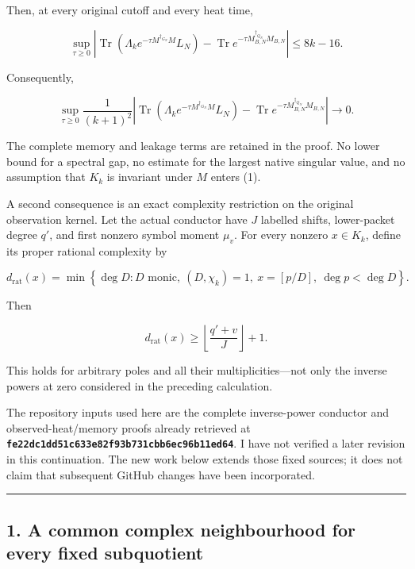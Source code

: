 \documentclass[11pt]{article}
\begin{document}
Then, at every original cutoff and every heat time,

\[
\boxed{
\sup_{\tau\ge0}
\left|
\operatorname{Tr}\!\left(\Lambda_k e^{-\tau M^{\dagger_{G_N}}M}L_N\right)
-\operatorname{Tr}e^{-\tau M_{B,N}^{\dagger_{Q_N}}M_{B,N}}
\right|
\le 8k-16.
}
\tag{1}
\]

Consequently,

\[
\boxed{
\sup_{\tau\ge0}
\frac1{(k+1)^2}
\left|
\operatorname{Tr}\!\left(\Lambda_k e^{-\tau M^{\dagger_{G_N}}M}L_N\right)
-\operatorname{Tr}e^{-\tau M_{B,N}^{\dagger_{Q_N}}M_{B,N}}
\right|
\longrightarrow0.
}
\tag{2}
\]

The complete memory and leakage terms are retained in the proof. No lower bound for a spectral gap, no estimate for the largest native singular value, and no assumption that \(K_k\) is invariant under \(M\) enters (1).

A second consequence is an exact complexity restriction on the original observation kernel. Let the actual conductor have \(J\) labelled shifts, lower-packet degree \(q'\), and first nonzero symbol moment \(\mu_v\). For every nonzero \(x\in K_k\), define its proper rational complexity by

\[
d_{\mathrm{rat}}(x)
=
\min\left\{
\deg D:
D\text{ monic},\ (D,\chi_k)=1,\ 
x=[p/D],\ \deg p<\deg D
\right\}.
\]

Then

\[
\boxed{
d_{\mathrm{rat}}(x)
\ge
\left\lfloor\frac{q'+v}{J}\right\rfloor+1.
}
\tag{3}
\]

This holds for arbitrary poles and all their multiplicities---not only the inverse powers at zero considered in the preceding calculation.

The repository inputs used here are the complete inverse-power conductor and observed-heat/memory proofs already retrieved at \textbf{\nolinkurl{fe22dc1dd51c633e82f93b731cbb6ec96b11ed64}}. I have not verified a later revision in this continuation. The new work below extends those fixed sources; it does not claim that subsequent GitHub changes have been incorporated.

\begin{center}\rule{0.5\linewidth}{0.5pt}\end{center}

\subsection{1. A common complex neighbourhood for every fixed subquotient}\label{a-common-complex-neighbourhood-for-every-fixed-subquotient}
\end{document}
